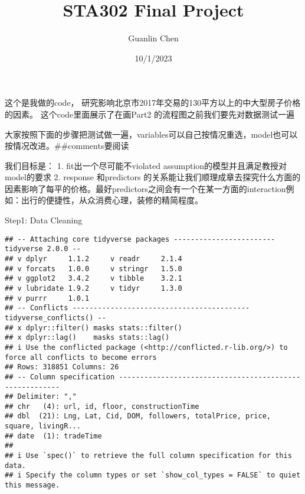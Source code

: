 \documentclass[
]{article}
\title{STA302 Final Project}
\author{Guanlin Chen}
\date{10/1/2023}
\begin{document}
\maketitle

这个是我做的code，
研究影响北京市2017年交易的130平方以上的中大型房子价格的因素。
这个code里面展示了在画Part2 的流程图之前我们要先对数据测试一遍

大家按照下面的步骤把测试做一遍，variables可以自己按情况重选，model也可以按情况改进。\#\#comments要阅读

我们目标是： 1. fit出一个尽可能不violated
assumption的模型并且满足教授对model的要求 2. response 和predictors
的关系能让我们顺理成章去探究什么方面的因素影响了每平的价格。最好predictors之间会有一个在某一方面的interaction例如：出行的便捷性，从众消费心理，装修的精简程度。

Step1: Data Cleaning

\begin{verbatim}
## -- Attaching core tidyverse packages ------------------------ tidyverse 2.0.0 --
## v dplyr     1.1.2     v readr     2.1.4
## v forcats   1.0.0     v stringr   1.5.0
## v ggplot2   3.4.2     v tibble    3.2.1
## v lubridate 1.9.2     v tidyr     1.3.0
## v purrr     1.0.1     
## -- Conflicts ------------------------------------------ tidyverse_conflicts() --
## x dplyr::filter() masks stats::filter()
## x dplyr::lag()    masks stats::lag()
## i Use the conflicted package (<http://conflicted.r-lib.org/>) to force all conflicts to become errors
## Rows: 318851 Columns: 26
## -- Column specification --------------------------------------------------------
## Delimiter: ","
## chr   (4): url, id, floor, constructionTime
## dbl  (21): Lng, Lat, Cid, DOM, followers, totalPrice, price, square, livingR...
## date  (1): tradeTime
## 
## i Use `spec()` to retrieve the full column specification for this data.
## i Specify the column types or set `show_col_types = FALSE` to quiet this message.
\end{verbatim}
\end{document}
